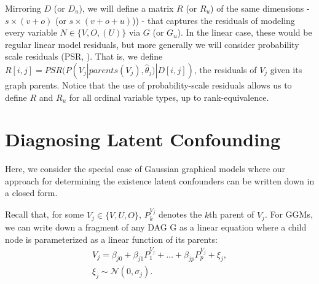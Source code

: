 \documentclass{article}
\begin{document}
Mirroring $D$ (or $D_u$), we will define a matrix $R$ (or $R_u$) of the same dimensions - $s \times (v + o)$ (or $s \times (v + o + u)$)) - that captures the residuals of modeling every variable $N \in \{V, O, (U)\}$ via $G$ (or $G_u$).  In the linear case, these would be regular linear model residuals, but more generally we will consider probability scale residuals (PSR, \cite{shepherd_probability-scale_2016}).  That is, we define $R[i, j] = PSR(P(V_j | parents(V_j), \hat{\theta}_j) | D[i, j])$, the residuals of $V_j$ given its graph parents.  Notice that the use of probability-scale residuals allows us to define $R$ and $R_u$ for all ordinal variable types, up to rank-equivalence.

\section{Diagnosing Latent Confounding}

Here, we consider the special case of Gaussian graphical models where our approach for determining the existence latent confounders can be written down in a closed form. 

Recall that, for some $V_j \in \{V, U, O\}$, $P^{V_j}_k$ denotes the $k$th parent of $V_j$.  For GGMs, we can write down a fragment of any DAG G as a linear equation where a child node is parameterized as a linear function of its parents:
\begin{equation}
\begin{align*}
V_j = \beta_{j0} + \beta_{j1} P^{V_j}_1 + \dots + \beta_{jp} P^{V_j}_p + \xi_j,\\\xi_j \sim \mathcal{N}(0, \sigma_j).
\end{align*}
\end{equation}	
\end{document}
